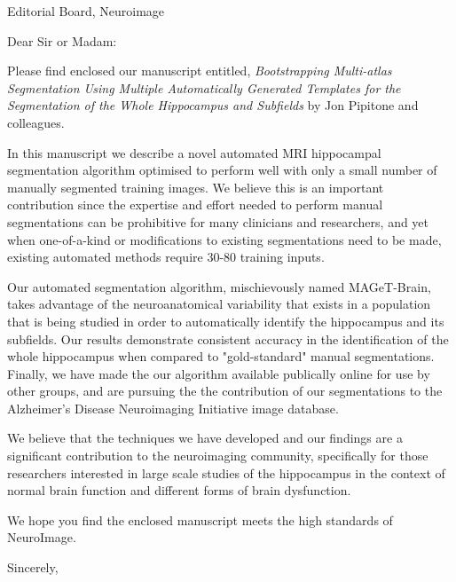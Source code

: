 \documentclass{letter}
\begin{document}
 
\begin{letter}{Editorial Board, Neuroimage}
\opening{Dear Sir or Madam:}

Please find enclosed our manuscript entitled, {\em Bootstrapping Multi-atlas
Segmentation Using Multiple Automatically Generated Templates for the
Segmentation of the Whole Hippocampus and Subfields} by Jon Pipitone and
colleagues.

In this manuscript we describe a novel automated MRI hippocampal segmentation
algorithm optimised to perform well with only a small number of manually
segmented training images. We believe this is an important contribution since
the expertise and effort needed to perform manual segmentations can be
prohibitive for many clinicians and researchers, and yet when one-of-a-kind or
modifications to existing segmentations need to be made, existing automated
methods require 30-80 training inputs.

Our automated segmentation algorithm, mischievously named MAGeT-Brain, takes
advantage of the neuroanatomical variability that exists in a population that
is being studied in order to automatically identify the hippocampus and its
subfields. Our results demonstrate consistent accuracy in the identification of
the whole hippocampus when compared to "gold-standard" manual segmentations.
Finally, we have made the our algorithm available publically online for use by
other groups, and are pursuing the the contribution of our segmentations to the
Alzheimer's Disease Neuroimaging Initiative image database.

We believe that the techniques we have developed and our findings are a
significant contribution to the neuroimaging community, specifically for those
researchers interested in large scale studies of the hippocampus in the context
of normal brain function and different forms of brain dysfunction.

We hope you find the enclosed manuscript meets the high standards of
NeuroImage.

 
\closing{Sincerely,}
 
 
\end{letter}
\end{document}
